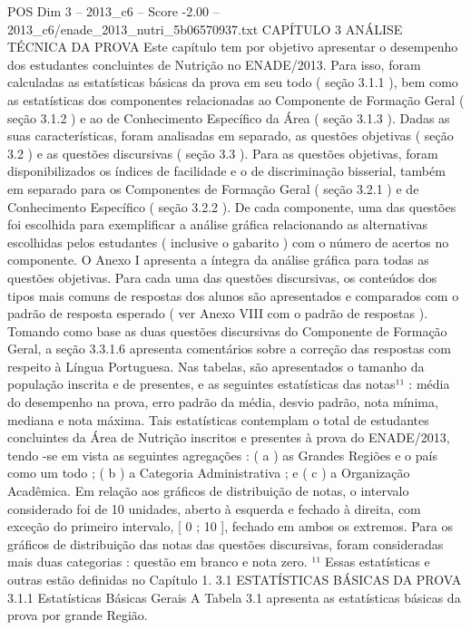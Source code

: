 \begin{textsample}{POS Dim 3 – 2013\_c6 – Score -2.00 – 2013\_c6/enade\_2013\_nutri\_5b06570937.txt}  \label{ex:f3_pos_234}
CAPÍTULO 3 ANÁLISE TÉCNICA DA PROVA Este capítulo tem por objetivo apresentar o desempenho dos estudantes concluintes de Nutrição no ENADE/2013.
Para isso, foram calculadas as estatísticas básicas da prova em seu todo ( seção 3.1.1 ), bem como as estatísticas dos componentes relacionadas ao Componente de Formação Geral ( seção 3.1.2 ) e ao de Conhecimento Específico da Área ( seção 3.1.3 ).
Dadas as suas características, foram analisadas em separado, as questões objetivas ( seção 3.2 ) e as questões discursivas ( seção 3.3 ).
Para as questões objetivas, foram disponibilizados os índices de facilidade e o de discriminação bisserial, também em separado para os Componentes de Formação Geral ( seção 3.2.1 ) e de Conhecimento Específico ( seção 3.2.2 ).
De cada componente, uma das questões foi escolhida para exemplificar a análise gráfica relacionando as alternativas escolhidas pelos estudantes ( inclusive o gabarito ) com o número de acertos no componente.
O Anexo I apresenta a íntegra da análise gráfica para todas as questões objetivas.
Para cada uma das questões discursivas, os conteúdos dos tipos mais comuns de respostas dos alunos são apresentados e comparados com o padrão de resposta esperado ( ver Anexo VIII com o padrão de respostas ).
Tomando como base as duas questões discursivas do Componente de Formação Geral, a seção 3.3.1.6 apresenta comentários sobre a correção das respostas com respeito à Língua Portuguesa.
Nas tabelas, são apresentados o tamanho da população inscrita e de presentes, e as seguintes estatísticas das notas¹¹ : média do desempenho na prova, erro padrão da média, desvio padrão, nota mínima, mediana e nota máxima.
Tais estatísticas contemplam o total de estudantes concluintes da Área de Nutrição inscritos e presentes à prova do ENADE/2013, tendo -se em vista as seguintes agregações : ( a ) as Grandes Regiões e o país como um todo ; ( b ) a Categoria Administrativa ; e ( c ) a Organização Acadêmica.
Em relação aos gráficos de distribuição de notas, o intervalo considerado foi de 10 unidades, aberto à esquerda e fechado à direita, com exceção do primeiro intervalo, [ 0 ; 10 ], fechado em ambos os extremos.
Para os gráficos de distribuição das notas das questões discursivas, foram consideradas mais duas categorias : questão em branco e nota zero. ¹¹ Essas estatísticas e outras estão definidas no Capítulo 1. 3.1 ESTATÍSTICAS BÁSICAS DA PROVA 3.1.1 Estatísticas Básicas Gerais A Tabela 3.1 apresenta as estatísticas básicas da prova por grande Região.

\end{textsample}
